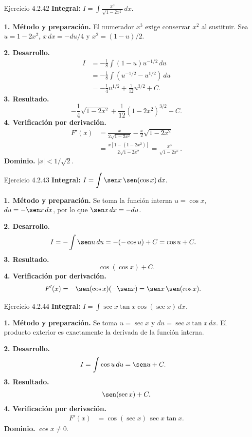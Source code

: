 \begin{examplebox}{Ejercicio 4.2.42}
\textbf{Integral:} $\displaystyle I=\int \frac{x^3}{\sqrt{1-2x^2}}\,dx$.

\textbf{1. Método y preparación.} El numerador $x^3$ exige conservar $x^2$ al sustituir. Sea $u=1-2x^2$, $x\,dx=-du/4$ y $x^2=(1-u)/2$.

\textbf{2. Desarrollo.}
\begin{align*}
I&=-\frac18\int(1-u)u^{-1/2}\,du\\&=-\frac18\int(u^{-1/2}-u^{1/2})\,du\\&=-\frac14u^{1/2}+\frac1{12}u^{3/2}+C.
\end{align*}
\textbf{3. Resultado.}
\[
-\frac14\sqrt{1-2x^2}+\frac1{12}(1-2x^2)^{3/2}+C.
\]
\textbf{4. Verificación por derivación.}
\begin{align*}
F'(x)&=\frac{x}{2\sqrt{1-2x^2}}-\frac{x}{2}\sqrt{1-2x^2}\\&=\frac{x[1-(1-2x^2)]}{2\sqrt{1-2x^2}}=\frac{x^3}{\sqrt{1-2x^2}}.
\end{align*}
\textbf{Dominio.} $|x|<1/\sqrt2$.
\end{examplebox}

\begin{examplebox}{Ejercicio 4.2.43}
\textbf{Integral:} $\displaystyle I=\int \sen x\,\sen(\cos x)\,dx$.

\textbf{1. Método y preparación.} Se toma la función interna $u=\cos x$, $du=-\sen x\,dx$, por lo que $\sen x\,dx=-du$.

\textbf{2. Desarrollo.}
\begin{align*}
I&=-\int\sen u\,du=-(-\cos u)+C=\cos u+C.
\end{align*}
\textbf{3. Resultado.}
\[
\cos(\cos x)+C.
\]
\textbf{4. Verificación por derivación.}
\begin{align*}
F'(x)&=-\sen(\cos x)(-\sen x)=\sen x\,\sen(\cos x).
\end{align*}
\end{examplebox}

\begin{examplebox}{Ejercicio 4.2.44}
\textbf{Integral:} $\displaystyle I=\int \sec x\tan x\cos(\sec x)\,dx$.

\textbf{1. Método y preparación.} Se toma $u=\sec x$ y $du=\sec x\tan x\,dx$. El producto exterior es exactamente la derivada de la función interna.

\textbf{2. Desarrollo.}
\begin{align*}
I&=\int\cos u\,du=\sen u+C.
\end{align*}
\textbf{3. Resultado.}
\[
\sen(\sec x)+C.
\]
\textbf{4. Verificación por derivación.}
\begin{align*}
F'(x)&=\cos(\sec x)\,\sec x\tan x.
\end{align*}
\textbf{Dominio.} $\cos x\ne0$.
\end{examplebox}

